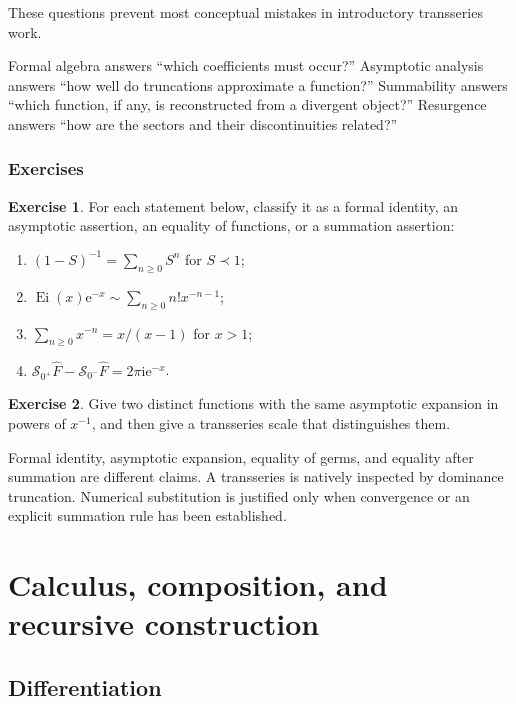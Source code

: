 \documentclass[11pt,openany]{book}
\theoremstyle{definition}
\newtheorem{exercise}{Exercise}[chapter]
\theoremstyle{plain}
\theoremstyle{remark}
\newcommand{\e}{\mathrm{e}}
\newcommand{\ii}{\mathrm{i}}
\newcommand{\asym}{\sim}
\newcommand{\precdom}{\prec}
\newcommand{\trans}[1]{\widehat{#1}}
\DeclareMathOperator{\Ei}{Ei}
\newcommand{\lateralsum}[1]{\mathcal{S}_{#1}}
\begin{document}
These questions prevent most conceptual mistakes in introductory transseries work.

\begin{checkpointbox}
Formal algebra answers ``which coefficients must occur?'' Asymptotic analysis answers ``how well do truncations approximate a function?'' Summability answers ``which function, if any, is reconstructed from a divergent object?'' Resurgence answers ``how are the sectors and their discontinuities related?''
\end{checkpointbox}

\section{Exercises}

\begin{exercise}
For each statement below, classify it as a formal identity, an asymptotic assertion, an equality of functions, or a summation assertion:
\begin{enumerate}
\item $(1-S)^{-1}=\sum_{n\ge0}S^n$ for $S\precdom1$;
\item $\Ei(x)\e^{-x}\asym\sum_{n\ge0}n!x^{-n-1}$;
\item $\sum_{n\ge0}x^{-n}=x/(x-1)$ for $x>1$;
\item $\lateralsum{0^+}\trans F-\lateralsum{0^-}\trans F=2\pi\ii\e^{-x}$.
\end{enumerate}
\end{exercise}

\begin{exercise}
Give two distinct functions with the same asymptotic expansion in powers of $x^{-1}$, and then give a transseries scale that distinguishes them.
\end{exercise}

\begin{summarybox}
Formal identity, asymptotic expansion, equality of germs, and equality after summation are different claims. A transseries is natively inspected by dominance truncation. Numerical substitution is justified only when convergence or an explicit summation rule has been established.
\end{summarybox}

\part{Calculus, composition, and recursive construction}

\chapter{Differentiation}\label{ch:differentiation}
\end{document}
